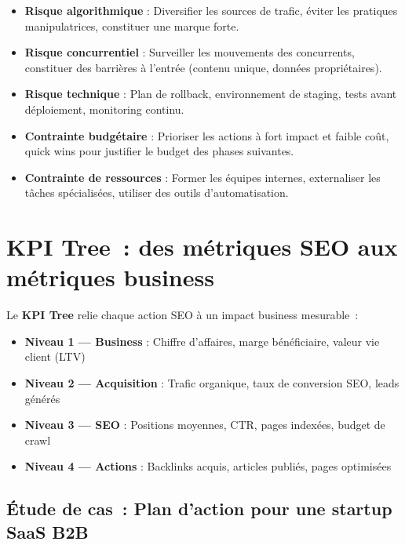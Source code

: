 \documentclass[12pt,a4paper,twoside]{report}
\newcommand{\keyword}[1]{\textbf{\textcolor{googleblue}{#1}}}
\begin{document}
\begin{itemize}
    \item \textbf{Risque algorithmique} : Diversifier les sources de trafic, éviter les pratiques manipulatrices, constituer une marque forte.
    \item \textbf{Risque concurrentiel} : Surveiller les mouvements des concurrents, constituer des barrières à l'entrée (contenu unique, données propriétaires).
    \item \textbf{Risque technique} : Plan de rollback, environnement de staging, tests avant déploiement, monitoring continu.
    \item \textbf{Contrainte budgétaire} : Prioriser les actions à fort impact et faible coût, quick wins pour justifier le budget des phases suivantes.
    \item \textbf{Contrainte de ressources} : Former les équipes internes, externaliser les tâches spécialisées, utiliser des outils d'automatisation.
\end{itemize}

\section{KPI Tree~: des métriques SEO aux métriques business}

Le \keyword{KPI Tree} relie chaque action SEO à un impact business mesurable~:

\begin{itemize}
    \item \textbf{Niveau 1 --- Business} : Chiffre d'affaires, marge bénéficiaire, valeur vie client (LTV)
    \item \textbf{Niveau 2 --- Acquisition} : Trafic organique, taux de conversion SEO, leads générés
    \item \textbf{Niveau 3 --- SEO} : Positions moyennes, CTR, pages indexées, budget de crawl
    \item \textbf{Niveau 4 --- Actions} : Backlinks acquis, articles publiés, pages optimisées
\end{itemize}

\subsection{Étude de cas~: Plan d'action pour une startup SaaS B2B}
\end{document}
